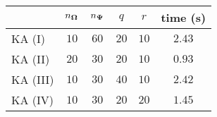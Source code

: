 \centering
\renewcommand{\arraystretch}{1.2}
\begin{tabular}{@{}lccccc@{}}
\toprule
 & $n_{\boldsymbol{\Omega}}$ & $n_{\boldsymbol{\Psi}}$ & $q$ & $r$ & time (s)\\
\midrule
KA (I) & $10$ & $60$ & $20$ & $10$ & $2.43$ \\
KA (II) & $20$ & $30$ & $20$ & $10$ & $0.93$ \\
KA (III) & $10$ & $30$ & $40$ & $10$ & $2.42$ \\
KA (IV) & $10$ & $30$ & $20$ & $20$ & $1.45$ \\
\bottomrule
\end{tabular}
